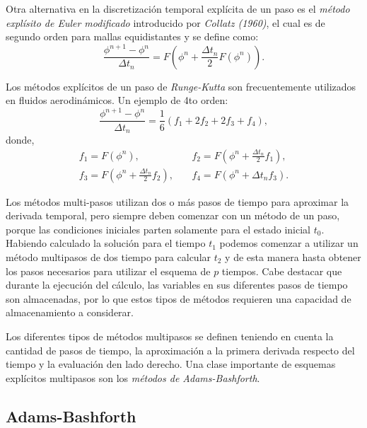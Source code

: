 \documentclass[a4paper,10pt, oneside]{book}
\begin{document}
Otra alternativa en la discretización temporal explícita de un paso es el \textit{método explísito de Euler modificado} introducido por \textit{Collatz (1960)}, el cual es de segundo orden para mallas equidistantes y se define como:
\begin{equation}
	\frac{\phi^{n+1} - \phi^n}{\Delta t_n} = F\left( \phi^n + \frac{\Delta t_n}{2} F(\phi^n) \right). \nonumber
\end{equation}

Los métodos explícitos de un paso de \textit{Runge-Kutta} son frecuentemente utilizados en fluidos aerodinámicos. Un ejemplo de 4to orden:
\begin{equation}
	\frac{\phi^{n+1} - \phi^n}{\Delta t_n} = \frac16 (f_1 + 2f_2 + 2f_3 + f_4), \nonumber
\end{equation}
donde,
\begin{eqnarray}
	f_1 = F(\phi^n), & ~ & f_2 = F \left( \phi^n + \frac{\Delta t_n}{2} f_1 \right), \nonumber \\
	f_3 = F \left( \phi^n + \frac{\Delta t_n}{2} f_2 \right), & ~ & f_4 = F \left( \phi^n + \Delta t_n f_3 \right). \nonumber
\end{eqnarray}

Los métodos multi-pasos utilizan dos o más pasos de tiempo para aproximar la derivada temporal, pero siempre deben comenzar con un método de un paso, porque las condiciones iniciales parten solamente para el estado inicial $t_0$. Habiendo calculado la solución para el tiempo $t_1$ podemos comenzar a utilizar un método multipasos de dos tiempo para calcular $t_2$ y de esta manera hasta obtener los pasos necesarios para utilizar el esquema de $p$ tiempos. Cabe destacar que durante la ejecución del cálculo, las variables en sus diferentes pasos de tiempo son almacenadas, por lo que estos tipos de métodos requieren una capacidad de almacenamiento a considerar.

Los diferentes tipos de métodos multipasos se definen teniendo en cuenta la cantidad de pasos de tiempo, la aproximación a la primera derivada respecto del tiempo y la evaluación den lado derecho. Una clase importante de esquemas explícitos multipasos son los \textit{métodos de Adams-Bashforth}.

\subsection{Adams-Bashforth}
\end{document}
